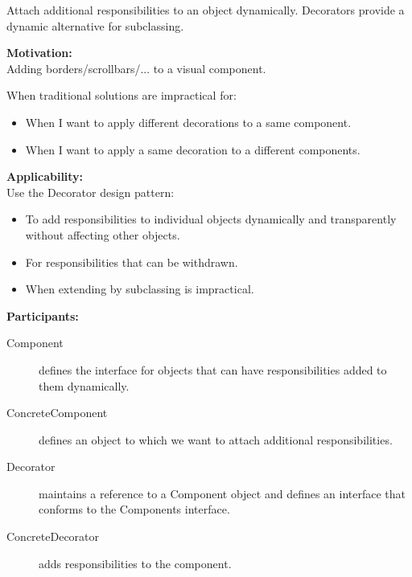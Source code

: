 Attach additional responsibilities to an object dynamically. Decorators provide a dynamic alternative for subclassing.



\vspace{12pt}\textbf{Motivation:}\\

Adding borders/scrollbars/... to a visual component.

When traditional solutions are impractical for:


\begin{itemize}
\item When I want to apply different decorations to a same component.
\item When I want to apply a same decoration to a different components.
\end{itemize}



\vspace{12pt}\textbf{Applicability:}\\

Use the Decorator design pattern:


\begin{itemize}
\item To add responsibilities to individual objects dynamically and transparently without affecting other objects.
\item For responsibilities that can be withdrawn.
\item When extending by subclassing is impractical.
\end{itemize}




\vspace{12pt}\textbf{Participants:}\\

\begin{description}
\item[Component]

	defines the interface for objects that can have responsibilities added to them dynamically.

\item[ConcreteComponent]

	defines an object to which we want to attach additional responsibilities.

\item[Decorator]

	maintains a reference to a Component object and defines an interface that conforms to the Components interface.

\item[ConcreteDecorator]

	adds responsibilities to the component.
\end{description}

